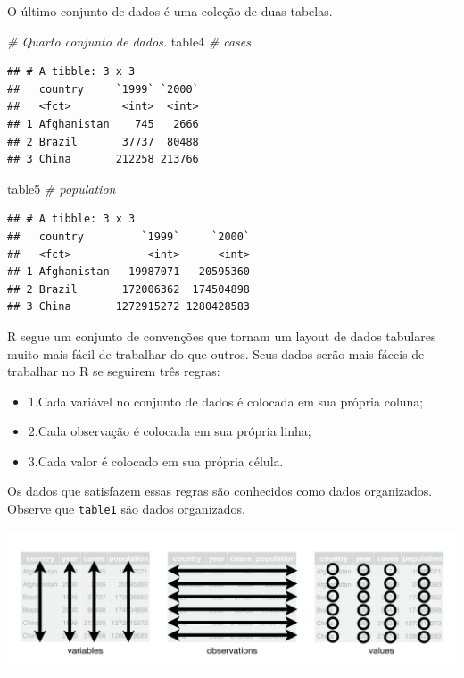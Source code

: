 \documentclass[]{book}
\newenvironment{Shaded}{\begin{snugshade}}{\end{snugshade}}
\newcommand{\CommentTok}[1]{\textcolor[rgb]{0.56,0.35,0.01}{\textit{#1}}}
\newcommand{\NormalTok}[1]{#1}
\providecommand{\tightlist}{%
  \setlength{\itemsep}{0pt}\setlength{\parskip}{0pt}}
\begin{document}
O último conjunto de dados é uma coleção de duas tabelas.

\begin{Shaded}
\begin{Highlighting}[]
\CommentTok{# Quarto conjunto de dados.}
\NormalTok{table4 }\CommentTok{# cases}
\end{Highlighting}
\end{Shaded}

\begin{verbatim}
## # A tibble: 3 x 3
##   country     `1999` `2000`
##   <fct>        <int>  <int>
## 1 Afghanistan    745   2666
## 2 Brazil       37737  80488
## 3 China       212258 213766
\end{verbatim}

\begin{Shaded}
\begin{Highlighting}[]
\NormalTok{table5 }\CommentTok{# population}
\end{Highlighting}
\end{Shaded}

\begin{verbatim}
## # A tibble: 3 x 3
##   country         `1999`     `2000`
##   <fct>            <int>      <int>
## 1 Afghanistan   19987071   20595360
## 2 Brazil       172006362  174504898
## 3 China       1272915272 1280428583
\end{verbatim}

R segue um conjunto de convenções que tornam um layout de dados tabulares muito mais fácil de trabalhar do que outros. Seus dados serão mais fáceis de trabalhar no R se seguirem três regras:

\begin{itemize}
\tightlist
\item
  1.Cada variável no conjunto de dados é colocada em sua própria coluna;
\item
  2.Cada observação é colocada em sua própria linha;
\item
  3.Cada valor é colocado em sua própria célula.
\end{itemize}

Os dados que satisfazem essas regras são conhecidos como dados organizados. Observe que \texttt{table1} são dados organizados.

\begin{center}\includegraphics[width=0.9\linewidth]{imagens/tidy-1} \end{center}
\end{document}
